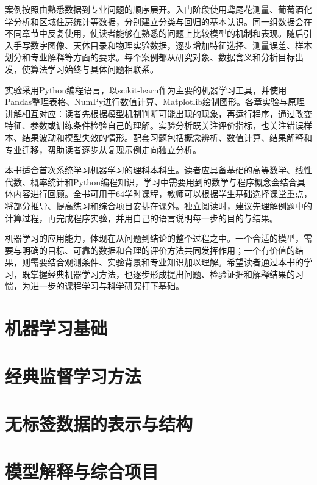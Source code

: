 \documentclass[UTF8,openany,11pt,a4paper]{ctexbook}
\begin{document}
案例按照由熟悉数据到专业问题的顺序展开。入门阶段使用鸢尾花测量、葡萄酒化学分析和区域住房统计等数据，分别建立分类与回归的基本认识。同一组数据会在不同章节中反复使用，使读者能够在熟悉的问题上比较模型的机制和表现。随后引入手写数字图像、天体目录和物理实验数据，逐步增加特征选择、测量误差、样本划分和专业解释等方面的要求。每个案例都从研究对象、数据含义和分析目标出发，使算法学习始终与具体问题相联系。

实验采用Python编程语言，以scikit-learn作为主要的机器学习工具，并使用Pandas整理表格、NumPy进行数值计算、Matplotlib绘制图形。各章实验与原理讲解相互对应：读者先根据模型机制判断可能出现的现象，再运行程序，通过改变特征、参数或训练条件检验自己的理解。实验分析既关注评价指标，也关注错误样本、结果波动和模型失效的情形。配套习题包括概念辨析、数值计算、结果解释和专业迁移，帮助读者逐步从复现示例走向独立分析。

本书适合首次系统学习机器学习的理科本科生。读者应具备基础的高等数学、线性代数、概率统计和Python编程知识，学习中需要用到的数学与程序概念会结合具体内容进行回顾。全书可用于64学时课程，教师可以根据学生基础选择课堂重点，将部分推导、提高练习和综合项目安排在课外。独立阅读时，建议先理解例题中的计算过程，再完成程序实验，并用自己的语言说明每一步的目的与结果。

机器学习的应用能力，体现在从问题到结论的整个过程之中。一个合适的模型，需要与明确的目标、可靠的数据和合理的评价方法共同发挥作用；一个有价值的结果，则需要结合观测条件、实验背景和专业知识加以理解。希望读者通过本书的学习，既掌握经典机器学习方法，也逐步形成提出问题、检验证据和解释结果的习惯，为进一步的课程学习与科学研究打下基础。

\tableofcontents
\mainmatter
\part{机器学习基础}




\part{经典监督学习方法}








\part{无标签数据的表示与结构}



\part{模型解释与综合项目}


\appendix






\backmatter

\end{document}
